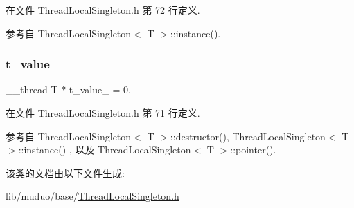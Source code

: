 在文件 Thread\+Local\+Singleton.\+h 第 72 行定义.



参考自 Thread\+Local\+Singleton$<$ T $>$\+::instance().

\mbox{\label{classmuduo_1_1ThreadLocalSingleton_ab5242a7394714fe0451f640456006dce}} 
\subsubsection{\texorpdfstring{t\+\_\+value\+\_\+}{t\_value\_}}
{\footnotesize\ttfamily \+\_\+\+\_\+thread T $\ast$ t\+\_\+value\+\_\+ = 0\hspace{0.3cm}{\ttfamily [static]}, {\ttfamily [private]}}



在文件 Thread\+Local\+Singleton.\+h 第 71 行定义.



参考自 Thread\+Local\+Singleton$<$ T $>$\+::destructor(), Thread\+Local\+Singleton$<$ T $>$\+::instance() , 以及 Thread\+Local\+Singleton$<$ T $>$\+::pointer().



该类的文档由以下文件生成\+:\begin{DoxyCompactItemize}
\item 
lib/muduo/base/\hyperlink{ThreadLocalSingleton_8h}{Thread\+Local\+Singleton.\+h}\end{DoxyCompactItemize}
